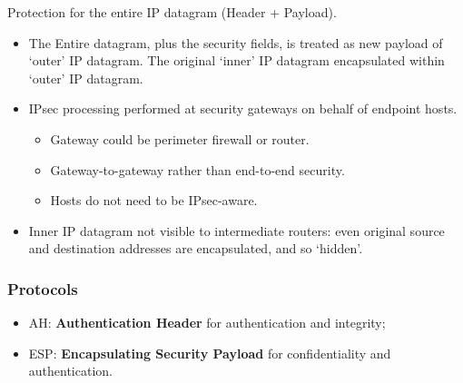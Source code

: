 \documentclass[a4paper, 10pt, titlepage]{article}
\begin{document}
Protection for the entire IP datagram (Header + Payload).	
\begin{itemize}
	\item The Entire datagram, plus the security fields, is treated as new payload of ‘outer’ IP datagram. The original ‘inner’ IP datagram encapsulated within ‘outer’ IP datagram. 
	\item IPsec processing performed at security gateways on behalf of endpoint hosts.
	\begin{itemize}
		\item Gateway could be perimeter firewall or router.
		\item Gateway-to-gateway rather than end-to-end security.
		\item Hosts do not need to be IPsec-aware.
	\end{itemize}
\item Inner IP datagram not visible to intermediate routers: even original source and destination addresses are encapsulated, and so ‘hidden’.
\end{itemize}

\subsubsection*{Protocols}
\begin{itemize}
	\item AH: \textbf{Authentication Header} for authentication and 	integrity;
	\item ESP: \textbf{Encapsulating Security Payload} for confidentiality and authentication.
\end{itemize}
\end{document}
